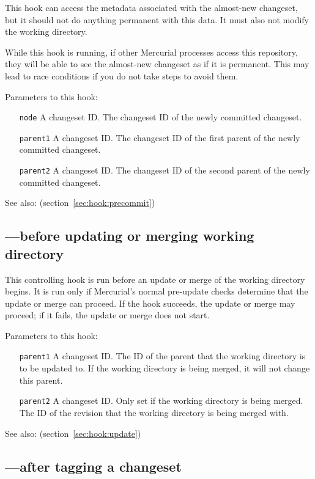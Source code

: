 This hook can access the metadata associated with the almost-new
changeset, but it should not do anything permanent with this data.  It
must also not modify the working directory.

While this hook is running, if other Mercurial processes access this
repository, they will be able to see the almost-new changeset as if it
is permanent.  This may lead to race conditions if you do not take
steps to avoid them.

Parameters to this hook:
\begin{itemize}
\item[\texttt{node}] A changeset ID.  The changeset ID of the newly
  committed changeset.
\item[\texttt{parent1}] A changeset ID.  The changeset ID of the first
  parent of the newly committed changeset.
\item[\texttt{parent2}] A changeset ID.  The changeset ID of the second
  parent of the newly committed changeset.
\end{itemize}

See also:  (section~\ref{sec:hook:precommit})

\subsection{---before updating or merging working directory}
\label{sec:hook:preupdate}

This controlling hook is run before an update or merge of the working
directory begins.  It is run only if Mercurial's normal pre-update
checks determine that the update or merge can proceed.  If the hook
succeeds, the update or merge may proceed; if it fails, the update or
merge does not start.

Parameters to this hook:
\begin{itemize}
\item[\texttt{parent1}] A changeset ID.  The ID of the parent that the
  working directory is to be updated to.  If the working directory is
  being merged, it will not change this parent.
\item[\texttt{parent2}] A changeset ID.  Only set if the working
  directory is being merged.  The ID of the revision that the working
  directory is being merged with.
\end{itemize}

See also:  (section~\ref{sec:hook:update})

\subsection{---after tagging a changeset}
\label{sec:hook:tag}


